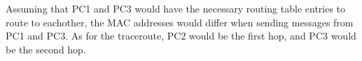 Assuming that PC1 and PC3 would have the necessary routing table entries to route to eachother, the MAC addresses would differ when sending messages from PC1 and PC3. As for the traceroute, PC2 would be the first hop, and PC3 would be the second hop. \\

